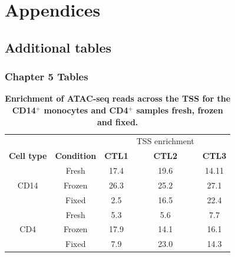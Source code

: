 \appendix
{}
\startcontents
{}
\begingroup
\let\clearpage\relax
\singlespacing
{}
\endgroup

\chapter{Appendices}
\label{app:Appendix}

\section{Additional tables}

\subsection{Chapter 5 Tables}

\begin{table}[htbp]
\centering
\begin{tabular}{@{} c c c c c}
\toprule
                   &                    &               & TSS enrichment &             \\
\textbf{Cell type} & \textbf{Condition} & \textbf{CTL1} & \textbf{CTL2} & \textbf{CTL3} \\
\midrule
\midrule
      & Fresh	 & 17.4 & 19.6 & 14.11\\
CD14	& Frozen & 26.3 & 25.2 & 27.1 \\
      & Fixed	 & 2.5  & 16.5 & 22.4 \\
\midrule
      & Fresh	 & 5.3  & 5.6  & 7.7 \\
CD4	  & Frozen & 17.9 & 14.1 & 16.1 \\
      & Fixed	 & 7.9  & 23.0 & 14.3 \\
\bottomrule
\end{tabular}
\medskip %
\caption[Enrichment of ATAC-seq reads across the TSS for the CD14$^+$ monocytes and CD4$^+$ samples fresh, frozen and fixed.]{\textbf{Enrichment of ATAC-seq reads across the TSS for the CD14$^+$ monocytes and CD4$^+$ samples fresh, frozen and fixed.}}
\label{tab:Core_ATAC_TSS_summary_table}
\end{table}
\bigskip %






